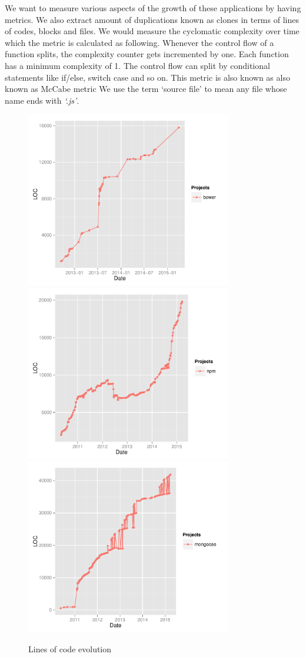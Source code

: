 \par
We want to measure various aspects of the growth of these applications by having metrics. We also extract amount of duplications known as clones in terms of lines of codes, blocks and files. We would measure the cyclomatic complexity over time which the metric is calculated as following. Whenever the control flow of a function splits, the complexity counter gets incremented by one. Each function has a minimum complexity of 1. The control flow can split by conditional statements like if/else, switch case and so on. This metric is also known as also known as McCabe metric
We use the term `source file' to mean any file whose name ends with \textit{`.js'}.

\begin{figure}[thb!]
	\caption{Lines of code evolution}
	\label{fig:lines_of_code}
	\includegraphics[width=90mm,scale=0.5]{figures/bower_loc}
	\includegraphics[width=90mm,scale=0.5]{figures/npm_loc}
	\centering
	\includegraphics[width=90mm,scale=0.5]{figures/mongoose_loc}
\end{figure}

